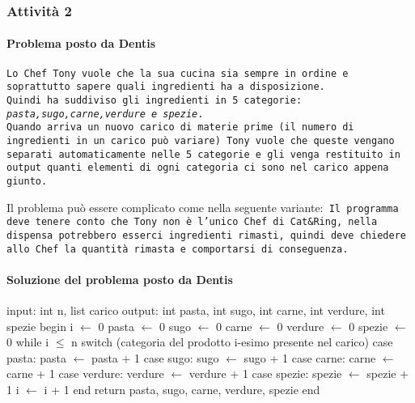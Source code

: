 \documentclass[a4paper]{article}
\begin{document}
\subsubsection{Attività 2}
\paragraph{Problema posto da Dentis}
\texttt{Lo Chef Tony vuole che la sua cucina sia sempre in ordine e soprattutto sapere quali ingredienti ha a disposizione.\\Quindi ha suddiviso gli ingredienti in 5 categorie: \textit{pasta,sugo,carne,verdure e spezie}.\\
Quando arriva un nuovo carico di materie prime (il numero di ingredienti in un carico può variare) Tony vuole che queste vengano separati automaticamente nelle 5 categorie e gli venga restituito in output quanti elementi di ogni categoria ci sono nel carico appena giunto.}

Il problema può essere complicato come nella seguente variante:\texttt{ Il programma deve tenere conto che Tony non è l'unico Chef di Cat\&Ring, nella dispensa potrebbero esserci ingredienti rimasti, quindi deve chiedere allo Chef la quantità rimasta e comportarsi di conseguenza.}
\paragraph{Soluzione del problema posto da Dentis}

\begin{algorithm}[caption={La cucina di Chef Tony (pt.1)}, label={alg1}]
 input: int n, list carico
 output: int pasta, int sugo, int carne, int verdure, int spezie
 begin
   i $\gets$ 0
   pasta $\gets$ 0
   sugo $\gets$ 0
   carne $\gets$ 0
   verdure $\gets$ 0
   spezie $\gets$ 0
   while i $\leq$ n
      switch (categoria del prodotto i-esimo presente nel carico)
        case pasta:
            pasta $\gets$ pasta + 1
        case sugo:
            sugo $\gets$ sugo + 1
        case carne:
            carne $\gets$ carne + 1
        case verdure:
            verdure $\gets$ verdure + 1
        case spezie:
            spezie $\gets$ spezie + 1
      i $\gets$ i + 1
   end
   return pasta, sugo, carne, verdure, spezie
 end
\end{algorithm}

\newpage
\end{document}

